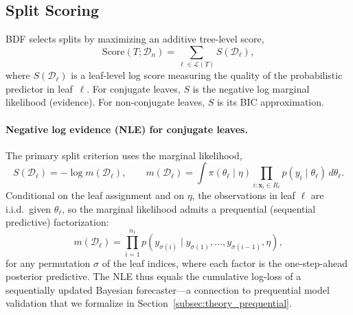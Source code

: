 \documentclass[twoside,11pt]{article}
\begin{document}
\subsection{Split Scoring}\label{subsec:split_scoring}

BDF selects splits by maximizing an additive tree-level score,
\begin{equation}\label{eq:additive_tree_score}
\mathrm{Score}(T;\mathcal{D}_n)
=
\sum_{\ell\in\mathcal{L}(T)} S(\mathcal{D}_\ell),
\end{equation}
where $S(\mathcal{D}_\ell)$ is a leaf-level log score measuring the quality of the probabilistic predictor in leaf~$\ell$. For conjugate leaves, $S$ is the negative log marginal likelihood (evidence). For non-conjugate leaves, $S$ is its BIC approximation.

\paragraph{Negative log evidence (NLE) for conjugate leaves.}
The primary split criterion uses the marginal likelihood,
\begin{equation}\label{eq:nle_leaf}
S(\mathcal{D}_\ell)
=
-\log m(\mathcal{D}_\ell),
\qquad
m(\mathcal{D}_\ell)
=
\int \pi(\theta_\ell\mid\eta)\prod_{i:\mathbf{x}_i\in R_\ell}p(y_i\mid\theta_\ell)\,d\theta_\ell.
\end{equation}
Conditional on the leaf assignment and on $\eta$, the observations in leaf $\ell$ are i.i.d.\ given $\theta_\ell$, so the marginal likelihood admits a prequential (sequential predictive) factorization:
\begin{equation}\label{eq:prequential}
m(\mathcal{D}_\ell)
= \prod_{i=1}^{n_\ell} p(y_{\sigma(i)} \mid y_{\sigma(1)},\dots,y_{\sigma(i-1)},\eta),
\end{equation}
for any permutation $\sigma$ of the leaf indices, where each factor is the one-step-ahead posterior predictive. The NLE thus equals the cumulative log-loss of a sequentially updated Bayesian forecaster---a connection to prequential model validation that we formalize in Section~\ref{subsec:theory_prequential}.
\end{document}
